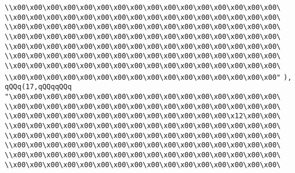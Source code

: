 \verb|\\x00\x00\x00\x00\x00\x00\x00\x00\x00\x00\x00\x00\x00\x00\x00\x00\|\newline
\verb|\\x00\x00\x00\x00\x00\x00\x00\x00\x00\x00\x00\x00\x00\x00\x00\x00\|\newline
\verb|\\x00\x00\x00\x00\x00\x00\x00\x00\x00\x00\x00\x00\x00\x00\x00\x00\|\newline
\verb|\\x00\x00\x00\x00\x00\x00\x00\x00\x00\x00\x00\x00\x00\x00\x00\x00\|\newline
\verb|\\x00\x00\x00\x00\x00\x00\x00\x00\x00\x00\x00\x00\x00\x00\x00\x00\|\newline
\verb|\\x00\x00\x00\x00\x00\x00\x00\x00\x00\x00\x00\x00\x00\x00\x00\x00\|\newline
\verb|\\x00\x00\x00\x00\x00\x00\x00\x00\x00\x00\x00\x00\x00\x00\x00\x00\|\newline
\verb|\\x00\x00\x00\x00\x00\x00\x00\x00\x00\x00\x00\x00\x00\x00\x00\x00"|\newline
\verb|),|\newline
\verb|qQQq(17,qQQqqQQq|\newline
\verb|"\x00\x00\x00\x00\x00\x00\x00\x00\x00\x00\x00\x00\x00\x00\x00\x00\|\newline
\verb|\\x00\x00\x00\x00\x00\x00\x00\x00\x00\x00\x00\x00\x00\x00\x00\x00\|\newline
\verb|\\x00\x00\x00\x00\x00\x00\x00\x00\x00\x00\x00\x00\x00\x12\x00\x00\|\newline
\verb|\\x00\x00\x00\x00\x00\x00\x00\x00\x00\x00\x00\x00\x00\x00\x00\x00\|\newline
\verb|\\x00\x00\x00\x00\x00\x00\x00\x00\x00\x00\x00\x00\x00\x00\x00\x00\|\newline
\verb|\\x00\x00\x00\x00\x00\x00\x00\x00\x00\x00\x00\x00\x00\x00\x00\x00\|\newline
\verb|\\x00\x00\x00\x00\x00\x00\x00\x00\x00\x00\x00\x00\x00\x00\x00\x00\|\newline
\verb|\\x00\x00\x00\x00\x00\x00\x00\x00\x00\x00\x00\x00\x00\x00\x00\x00\|\newline
